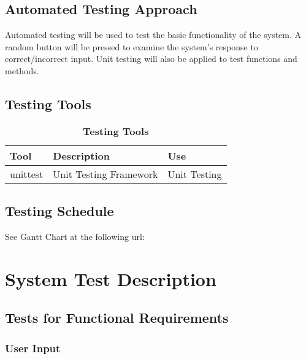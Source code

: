 \documentclass[12pt, titlepage]{article}
\begin{document}
\subsection{Automated Testing Approach}
Automated testing will be used to test the basic functionality of the system. A random button will be pressed to examine the system's response to correct/incorrect input. Unit testing will also be applied to test functions and methods.

\subsection{Testing Tools}
\begin{table}[h]
\caption{\bf Testing Tools}
\begin{tabularx}{\textwidth}{p{3cm}p{6cm}X}
\toprule {\bf Tool} & {\bf Description} & {\bf Use}\\
\midrule
unittest & Unit Testing Framework & Unit Testing \\
\bottomrule
\end{tabularx}
\end{table}

\subsection{Testing Schedule}

See Gantt Chart at the following url:

\section{System Test Description}
	
\subsection{Tests for Functional Requirements}

\subsubsection{User Input}
		
\end{document}
